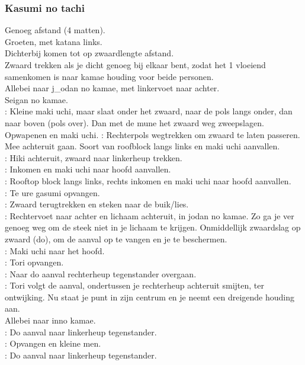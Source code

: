 \subsubsection{Kasumi no tachi}

Genoeg afstand (4 matten).\\
Groeten, met katana links.\\
Dichterbij komen tot op zwaardlengte afstand.\\
Zwaard trekken als je dicht genoeg bij elkaar bent, zodat het 1 vloeiend samenkomen is naar kamae houding voor beide personen.\\
Allebei naar j\_{o}dan no kamae, met linkervoet naar achter.\\
Seigan no kamae.\\
\pA: Kleine maki uchi, maar slaat onder het zwaard, naar de pols langs onder, dan naar boven (pols over). Dan met de mune het zwaard weg zweepslagen. Opwapenen en maki uchi.
\pB: Rechterpols wegtrekken om zwaard te laten passeren. Mee achteruit gaan. Soort van roofblock langs links en maki uchi aanvallen.\\
\pA: Hiki achteruit, zwaard naar linkerheup trekken.\\
\pB: Inkomen en maki uchi naar hoofd aanvallen.\\
\pA: Rooftop block langs links, rechts inkomen en maki uchi naar hoofd aanvallen.\\
\pB: Te ure gasumi opvangen.\\
\pA: Zwaard terugtrekken en steken naar de buik/lies.\\
\pB: Rechtervoet naar achter en lichaam achteruit, in jodan no kamae. Zo ga je ver genoeg weg om de steek niet in je lichaam te krijgen. Onmiddellijk zwaardslag op zwaard (do), om de aanval op te vangen en je te beschermen.\\
\pA: Maki uchi naar het hoofd.\\
\pB: Tori opvangen.\\
\pA: Naar do aanval rechterheup tegenstander overgaan.\\
\pB: Tori volgt de aanval, ondertussen je rechterheup achteruit smijten, ter ontwijking. Nu staat je punt in zijn centrum en je neemt een dreigende houding aan.\\
Allebei naar inno kamae.\\
\pB: Do aanval naar linkerheup tegenstander.\\
\pA: Opvangen en kleine men.\\
\pB: Do aanval naar linkerheup tegenstander.\\
